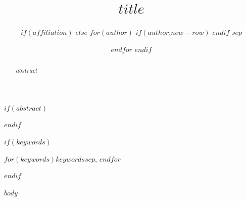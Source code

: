 \documentclass[conference]{IEEEtran}
\title{$title$}
\author{%
$if(affiliation)$
  \IEEEauthorblockN{%
$for(author)$
$if(author.name)$$author.name$$else$$author$$endif$$sep$, $endfor$
  }
  \IEEEauthorblockA{%
$for(affiliation)$$affiliation$$sep$\\$endfor$
  }
$else$
$for(author)$
$if(author.new-row)$
  \linebreakand
$endif$
  \IEEEauthorblockN{$author.name$}
  \IEEEauthorblockA{%
$if(author.program)$
    $author.program$\\
$endif$
$if(author.institution)$
    $author.institution$\\
$endif$
$if(author.location)$
    $author.location$
$endif$
$if(author.email)$
    \\\texttt{$author.email$}
$endif$
  }
$sep$
  \and
$endfor$
$endif$
}
\begin{document}
\maketitle

$if(abstract)$
\begin{abstract}
$abstract$
\end{abstract}
$endif$

$if(keywords)$
\begin{IEEEkeywords}
$for(keywords)$$keywords$$sep$, $endfor$
\end{IEEEkeywords}
$endif$

$body$
\end{document}
